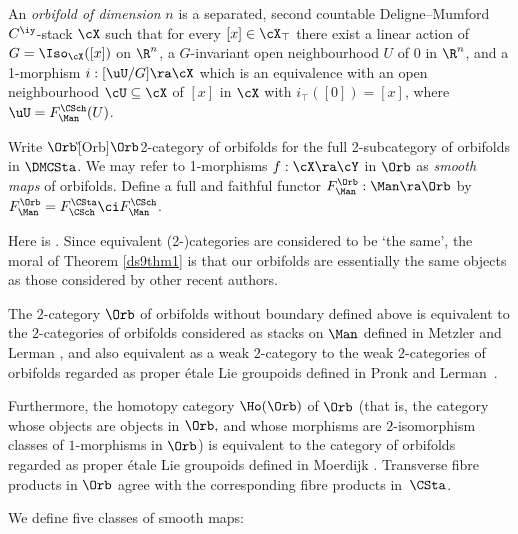 \documentclass{article}
\begin{document}
\begin{dfn} An {\it orbifold of dimension\/} $n$ is a separated,
second countable Deligne--Mumford $C^\iy$-stack $\cX$ such that for
every $[x]\in\cX_\top$ there exist a linear action of
$G=\Iso_\cX([x])$ on $\R^n$, a $G$-invariant open neighbourhood $U$
of 0 in $\R^n$, and a 1-morphism $i:[\uU/G]\ra\cX$ which is an
equivalence with an open neighbourhood $\cU\subseteq\cX$ of $[x]$ in
$\cX$ with $i_\top([0])=[x]$, where $\uU=F_\Man^\CSch(U)$.

Write $\Orb$\G[Orb]{$\Orb$}{2-category of orbifolds} for the full
2-subcategory of orbifolds in $\DMCSta$. We may refer to 1-morphisms
$f:\cX\ra\cY$ in $\Orb$ as {\it smooth maps\/} of orbifolds. Define
a full and faithful functor
$F_\Man^\Orb:\Man\ra\Orb$ by~$F_\Man^\Orb=F_\CSch^\CSta\ci
F_\Man^\CSch$.
\label{ds9def1}
\end{dfn}

Here is \cite[Th.~9.26 \& Cor.~9.27]{Joyc4}. Since equivalent
(2-)categories are considered to be `the same', the moral of Theorem
\ref{ds9thm1} is that our orbifolds are essentially the same objects
as those considered by other recent authors.

\begin{thm} The $2$-category\/ $\Orb$ of orbifolds without boundary
defined above is equivalent to the $2$-categories of orbifolds
considered as stacks on $\Man$ defined in Metzler\/ {\rm\cite[\S 3.4]{Metz}} and
Lerman\/ {\rm\cite[\S 4]{Lerm},} and also equivalent as a weak\/
$2$-category to the weak\/ $2$-categories of
orbifolds regarded as proper \'etale Lie groupoids defined in Pronk\/ {\rm\cite{Pron}} and
Lerman\/~{\rm\cite[\S 3.3]{Lerm}}.

Furthermore, the homotopy category $\Ho(\Orb)$ of\/ $\Orb$ (that is, the
category whose objects are objects in\/ $\Orb,$ and whose morphisms
are $2$-isomorphism classes of\/ $1$-morphisms in\/ $\Orb$) is
equivalent to the category of orbifolds regarded as proper \'etale
Lie groupoids defined in Moerdijk\/ {\rm\cite{Moer}}. Transverse
fibre products in\/ $\Orb$ agree with the corresponding fibre
products in\/~$\CSta$.
\label{ds9thm1}
\end{thm}

We define five classes of smooth maps:
\end{document}
